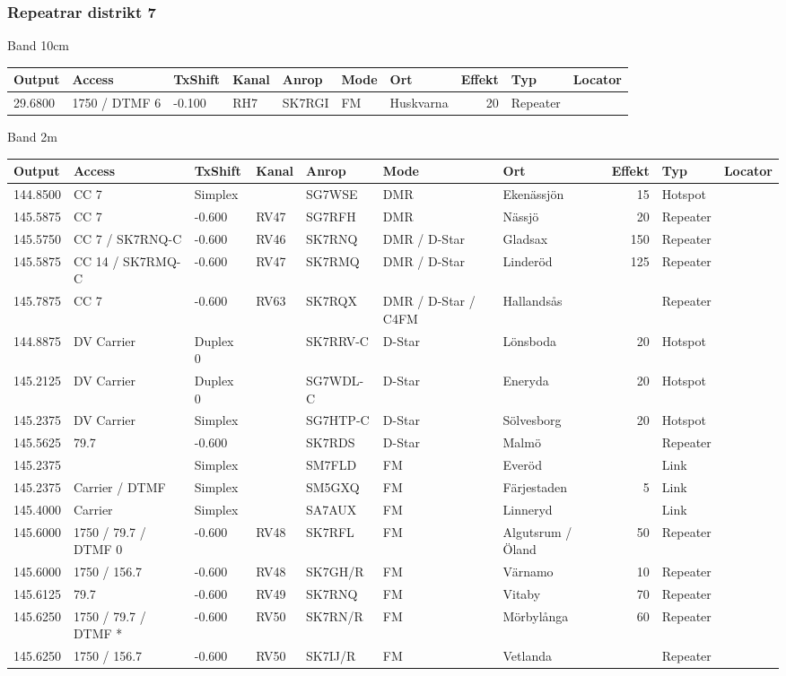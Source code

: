 \subsubsection{Repeatrar distrikt 7}
\large{Band 10cm}
\begin{longtable}{lllllllrlr}
Output & Access & TxShift & Kanal & Anrop & Mode & Ort & Effekt & Typ & Locator \\ \hline
29.6800&1750 / DTMF 6&-0.100&RH7&SK7RGI&FM&Huskvarna&20&Repeater&\\
\end{longtable}
\large{Band 2m}
\begin{longtable}{lllllllrlr}
Output & Access & TxShift & Kanal & Anrop & Mode & Ort & Effekt & Typ & Locator \\ \hline
144.8500&CC 7&Simplex&&SG7WSE&DMR&Ekenässjön&15&Hotspot&\\
145.5875&CC 7&-0.600&RV47&SG7RFH&DMR&Nässjö&20&Repeater&\\
145.5750&CC 7 / SK7RNQ-C&-0.600&RV46&SK7RNQ&DMR / D-Star&Gladsax&150&Repeater&\\
145.5875&CC 14 / SK7RMQ-C&-0.600&RV47&SK7RMQ&DMR / D-Star&Linderöd&125&Repeater&\\
145.7875&CC 7&-0.600&RV63&SK7RQX&DMR / D-Star / C4FM&Hallandsås&&Repeater&\\
144.8875&DV Carrier&Duplex 0&&SK7RRV-C&D-Star&Lönsboda&20&Hotspot&\\
145.2125&DV Carrier&Duplex 0&&SG7WDL-C&D-Star&Eneryda&20&Hotspot&\\
145.2375&DV Carrier&Simplex&&SG7HTP-C&D-Star&Sölvesborg&20&Hotspot&\\
145.5625&79.7&-0.600&&SK7RDS&D-Star&Malmö&&Repeater&\\
145.2375&&Simplex&&SM7FLD&FM&Everöd&&Link&\\
145.2375&Carrier / DTMF&Simplex&&SM5GXQ&FM&Färjestaden&5&Link&\\
145.4000&Carrier&Simplex&&SA7AUX&FM&Linneryd&&Link&\\
145.6000&1750 / 79.7 / DTMF 0&-0.600&RV48&SK7RFL&FM&Algutsrum / Öland&50&Repeater&\\
145.6000&1750 / 156.7&-0.600&RV48&SK7GH/R&FM&Värnamo&10&Repeater&\\
145.6125&79.7&-0.600&RV49&SK7RNQ&FM&Vitaby&70&Repeater&\\
145.6250&1750 / 79.7 / DTMF *&-0.600&RV50&SK7RN/R&FM&Mörbylånga&60&Repeater&\\
145.6250&1750 / 156.7&-0.600&RV50&SK7IJ/R&FM&Vetlanda&&Repeater&\\

\end{longtable}
